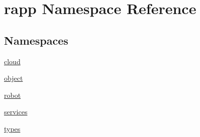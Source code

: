 \hypertarget{namespacerapp}{\section{rapp Namespace Reference}
\label{namespacerapp}
}
\subsection*{Namespaces}
\begin{DoxyCompactItemize}
\item 
\hyperlink{namespacerapp_1_1cloud}{cloud}
\item 
\hyperlink{namespacerapp_1_1object}{object}
\item 
\hyperlink{namespacerapp_1_1robot}{robot}
\item 
\hyperlink{namespacerapp_1_1services}{services}
\item 
\hyperlink{namespacerapp_1_1types}{types}
\end{DoxyCompactItemize}
